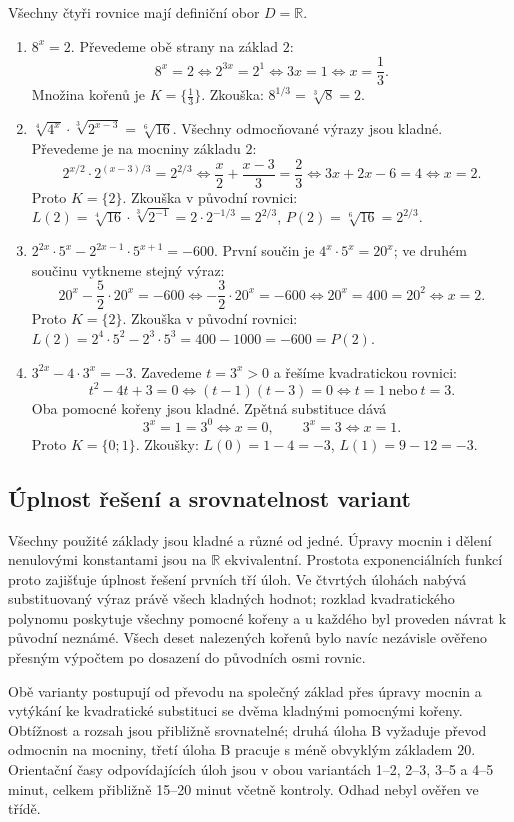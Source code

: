 \documentclass[a4paper,10pt]{article}
\begin{document}
Všechny čtyři rovnice mají definiční obor $D=\mathbb{R}$.
\begin{enumerate}
\item $8^{x} = 2$.
Převedeme obě strany na základ $2$:
\[
8^x=2 \iff 2^{3x}=2^1 \iff 3x=1 \iff x=\frac13.
\]
Množina kořenů je $K=\{\frac13\}$.
Zkouška: $8^{1/3}=\sqrt[3]{8}=2$.

\item $\sqrt[4]{4^x} \cdot \sqrt[3]{2^{x-3}} = \sqrt[6]{16}$.
Všechny odmocňované výrazy jsou kladné. Převedeme je na mocniny základu $2$:
\[
2^{x/2}\cdot 2^{(x-3)/3}=2^{2/3}
\iff \frac{x}{2}+\frac{x-3}{3}=\frac23
\iff 3x+2x-6=4 \iff x=2.
\]
Proto $K=\{2\}$.
Zkouška v původní rovnici:
$L(2)=\sqrt[4]{16}\cdot\sqrt[3]{2^{-1}}
=2\cdot2^{-1/3}=2^{2/3}$,
$P(2)=\sqrt[6]{16}=2^{2/3}$.

\item $2^{2x} \cdot 5^{x} - 2^{2x-1} \cdot 5^{x+1} = -600$.
První součin je $4^x\cdot5^x=20^x$; ve druhém součinu
vytkneme stejný výraz:
\[
20^x-\frac52\cdot20^x=-600
\iff -\frac32\cdot20^x=-600
\iff 20^x=400=20^2 \iff x=2.
\]
Proto $K=\{2\}$.
Zkouška v původní rovnici:
$L(2)=2^4\cdot5^2-2^3\cdot5^3=400-1000=-600=P(2)$.

\item $3^{2x} - 4 \cdot 3^{x} = -3$.
Zavedeme $t=3^x>0$ a řešíme kvadratickou rovnici:
\[
t^2-4t+3=0 \iff (t-1)(t-3)=0 \iff t=1\ \text{nebo}\ t=3.
\]
Oba pomocné kořeny jsou kladné. Zpětná substituce dává
\[
3^x=1=3^0 \iff x=0,
\qquad 3^x=3 \iff x=1.
\]
Proto $K=\{0;1\}$.
Zkoušky: $L(0)=1-4=-3$, $L(1)=9-12=-3$.
\end{enumerate}

\subsection*{Úplnost řešení a srovnatelnost variant}
Všechny použité základy jsou kladné a různé od jedné.
Úpravy mocnin i dělení nenulovými konstantami jsou na $\mathbb{R}$ ekvivalentní.
Prostota exponenciálních funkcí proto zajišťuje úplnost řešení prvních tří úloh.
Ve čtvrtých úlohách nabývá substituovaný výraz právě všech kladných hodnot;
rozklad kvadratického polynomu poskytuje všechny pomocné kořeny
a u každého byl proveden návrat k původní neznámé.
Všech deset nalezených kořenů bylo navíc nezávisle ověřeno přesným
výpočtem po dosazení do původních osmi rovnic.

Obě varianty postupují od převodu na společný základ přes úpravy mocnin
a vytýkání ke kvadratické substituci se dvěma kladnými pomocnými kořeny.
Obtížnost a rozsah jsou přibližně srovnatelné; druhá úloha B vyžaduje
převod odmocnin na mocniny, třetí úloha B pracuje s méně obvyklým základem $20$.
Orientační časy odpovídajících úloh jsou v obou variantách
1--2, 2--3, 3--5 a 4--5 minut, celkem přibližně 15--20 minut včetně kontroly.
Odhad nebyl ověřen ve třídě.
\end{document}
